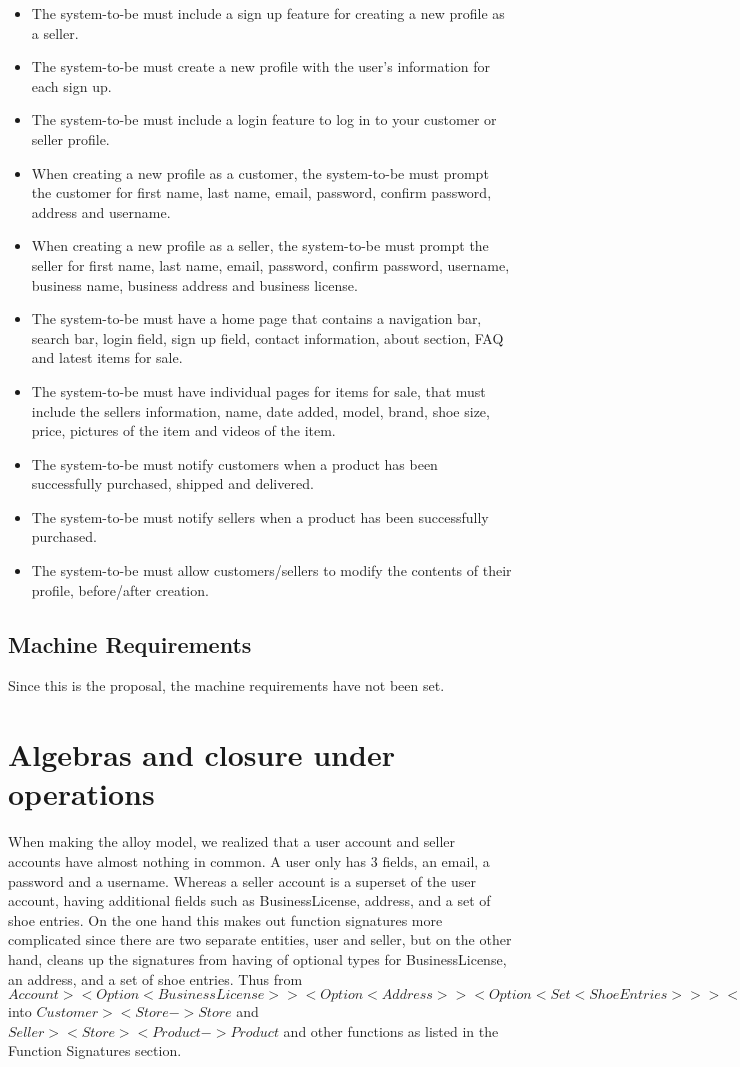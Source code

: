\begin{itemize}
  \item The system-to-be must include a sign up feature for creating a new profile as a seller.
  \item The system-to-be must create a new profile with the user's information for each sign up.
  \item The system-to-be must include a login feature to log in to your customer or seller profile.
  \item When creating a new profile as a customer, the system-to-be must prompt the customer for first name, last name, email, password, confirm password, address and username.
  \item When creating a new profile as a seller, the system-to-be must prompt the seller for first name, last name, email, password, confirm password, username, business name, business address and business license.
  \item The system-to-be must have a home page that contains a navigation bar, search bar, login field, sign up field, contact information, about section, FAQ and latest items for sale.
  \item The system-to-be must have individual pages for items for sale, that must include the sellers information, name, date added, model, brand, shoe size, price, pictures of the item and videos of the item.
  \item The system-to-be must notify customers when a product has been successfully purchased, shipped and delivered.
  \item The system-to-be must notify sellers when a product has been successfully purchased.
  \item The system-to-be must allow customers/sellers to modify the contents of their profile, before/after creation.
\end{itemize}
\subsection{Machine Requirements}
Since this is the proposal, the machine requirements have not been set.
\section{Algebras and closure under operations}
When making the alloy model, we realized that a user account and seller accounts have almost nothing in common. A user only has 3 fields, an email, a password and a username. Whereas a seller account is a superset of the user account, having additional fields such as BusinessLicense, address, and a set of shoe entries. On the one hand this makes out function signatures more complicated since there are two separate entities, user and seller, but on the other hand, cleans up the signatures from having of optional types for BusinessLicense, an address, and a set of shoe entries. Thus from $Account >< Option<BusinessLicense>> < Option<Address> >< Option<Set<ShoeEntries>> >< Store -> Store$ into $Customer >< Store -> Store$ and $Seller >< Store >< Product -> Product$ and other functions as listed in the Function Signatures section.
